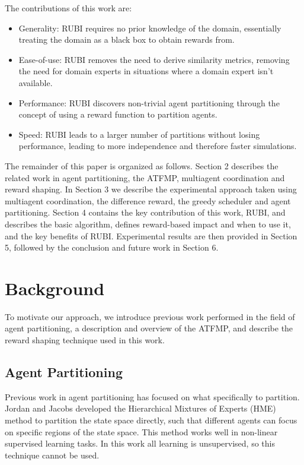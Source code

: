 \documentclass{aamas2014}
\begin{document}
The contributions of this work are:
\begin{itemize} 
\item Generality: RUBI requires no prior knowledge of the domain, essentially treating the domain as a black box to obtain rewards from.
\item Ease-of-use: RUBI removes the need to derive similarity metrics, removing the need for domain experts in situations where a domain expert isn't available.
\item Performance: RUBI discovers non-trivial agent partitioning through the concept of using a reward function to partition agents.
\item Speed: RUBI leads to a larger number of partitions without losing performance, leading to more independence and therefore faster simulations.
\end{itemize} 
 
The remainder of this paper is organized as follows. Section 2 describes the related work in agent partitioning, the ATFMP, multiagent coordination and reward shaping. In Section 3 we describe the experimental approach taken using multiagent coordination, the difference reward, the greedy scheduler and agent partitioning. Section 4 contains the key contribution of this work, RUBI, and describes the basic algorithm, defines reward-based impact and when to use it, and the key benefits of RUBI. Experimental results are then provided in Section 5, followed by the conclusion and future work in Section 6.

\section{Background}
\label{sec:BACKGROUND}

To motivate our approach, we introduce previous work performed in the field of agent partitioning, a description and overview of the ATFMP, and describe the reward shaping technique used in this work.

\subsection{Agent Partitioning}

Previous work in agent partitioning has focused on what specifically to partition. Jordan and Jacobs \cite{716791} developed the Hierarchical Mixtures of Experts (HME) method to partition the state space directly, such that different agents can focus on specific regions of the state space. This method works well in non-linear supervised learning tasks. In this work all learning is unsupervised, so this technique cannot be used.
\end{document}
